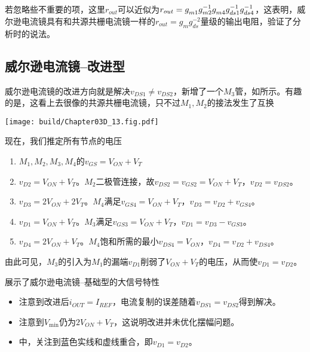 若忽略些不重要的项，这里$r_{out}$可以近似为$r_{out}=g_{m1}^{\vphantom{-1}}g_{m2}^{-1}g_{m4}^{\vphantom{-1}}g_{ds1}^{-1}g_{ds4}^{-1}$，这表明，威尔逊电流镜具有和共源共栅电流镜一样的$r_{out}=g_{m}g_{ds}^{-2}$量级的输出电阻，验证了分析时的说法。

\subsection{威尔逊电流镜--改进型}
威尔逊电流镜的改进方向就是解决$v_{DS1}\neq v_{DS2}$，新增了一个$M_3$管，如所示。有趣的是，这看上去很像的共源共栅电流镜，只不过$M_1,M_2$的接法发生了互换

\begin{Figure}
    \texttt{[image: build/Chapter03D\_13.fig.pdf]}
\end{Figure}

现在，我们推定所有节点的电压
\begin{enumerate}
    \item $M_1,M_2,M_3,M_4$的$v_{GS}=V_{ON}+V_T$
    \item $v_{D2}=V_{ON}+V_T$。$M_2$二极管连接，故$v_{DS2}=v_{GS2}=V_{ON}+V_T$，$v_{D2}=v_{DS2}$。
    \item $v_{D3}=2V_{ON}+2V_T$。$M_4$满足$v_{GS4}=V_{ON}+V_T$，$v_{D3}=v_{D2}+v_{GS4}$。
    \item $v_{D1}=V_{ON}+V_T$。$M_3$满足$v_{GS3}=V_{ON}+V_T$，$v_{D1}=v_{D3}-v_{GS3}$。
    \item $v_{D4}=2V_{ON}+V_T$。$M_4$饱和所需的最小$v_{DS4}=V_{ON}$，$v_{D4}=v_{D2}+v_{DS4}$。
\end{enumerate}
由此可见，$M_3$的引入为$M_1$的漏端$v_{D1}$削弱了$V_{ON}+V_T$的电压，从而使$v_{D1}=v_{D2}$。

展示了威尔逊电流镜--基础型的大信号特性
\begin{itemize}
    \item 注意到改进后$i_{OUT}=I_{REF}$，电流复制的误差随着$v_{DS1}=v_{DS2}$得到解决。
    \item 注意到$V_{\min}$仍为$2V_{ON}+V_T$，这说明改进并未优化摆幅问题。
    \item {}中，关注到蓝色实线和虚线重合，即$v_{D1}=v_{D2}$。
\end{itemize}

